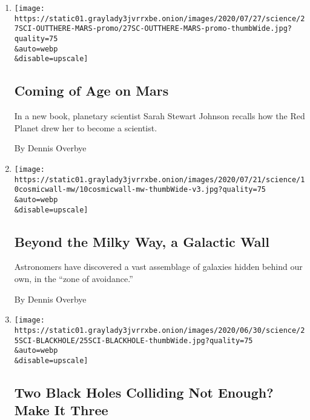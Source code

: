\begin{enumerate}
\def\labelenumi{\arabic{enumi}.}
\item
  \href{/2020/07/27/science/mars-sarah-stewart-johnson.html}{}

  \texttt{[image: https://static01.graylady3jvrrxbe.onion/images/2020/07/27/science/27SCI-OUTTHERE-MARS-promo/27SC-OUTTHERE-MARS-promo-thumbWide.jpg?quality=75\\\&auto=webp\\\&disable=upscale]}

  \hypertarget{coming-of-age-on-mars}{%
  \subsection{Coming of Age on Mars}\label{coming-of-age-on-mars}}

  In a new book, planetary scientist Sarah Stewart Johnson recalls how
  the Red Planet drew her to become a scientist.

  By Dennis Overbye
\item
  \href{/2020/07/10/science/astronomy-galaxies-attractor-universe.html}{}

  \texttt{[image: https://static01.graylady3jvrrxbe.onion/images/2020/07/21/science/10cosmicwall-mw/10cosmicwall-mw-thumbWide-v3.jpg?quality=75\\\&auto=webp\\\&disable=upscale]}

  \hypertarget{beyond-the-milky-way-a-galactic-wall}{%
  \subsection{Beyond the Milky Way, a Galactic
  Wall}\label{beyond-the-milky-way-a-galactic-wall}}

  Astronomers have discovered a vast assemblage of galaxies hidden
  behind our own, in the ``zone of avoidance.''

  By Dennis Overbye
\item
  \href{/2020/06/25/science/black-hole-collision-ligo.html}{}

  \texttt{[image: https://static01.graylady3jvrrxbe.onion/images/2020/06/30/science/25SCI-BLACKHOLE/25SCI-BLACKHOLE-thumbWide.jpg?quality=75\\\&auto=webp\\\&disable=upscale]}

  \hypertarget{two-black-holes-colliding-not-enough-make-it-three}{%
  \subsection{Two Black Holes Colliding Not Enough? Make It
  Three}\label{two-black-holes-colliding-not-enough-make-it-three}}


\end{enumerate}
